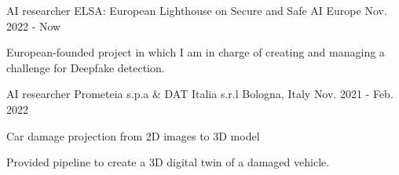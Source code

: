 \begin{cventries}
  \cventry
    {AI researcher} %
    {ELSA: European Lighthouse on Secure and Safe AI} %
    {Europe} %
    {Nov. 2022 - Now} %
    {
      \begin{cvitems}
          \item {European-founded project in which I am in charge of creating and managing a challenge for Deepfake detection. }
      \end{cvitems}
    }
  \cventry
    {AI researcher} %
    {Prometeia s.p.a \& DAT Italia s.r.l} %
    {Bologna, Italy} %
    {Nov. 2021 - Feb. 2022} %
    {
      \begin{cvitems} %
        \item {Car damage projection from 2D images to 3D model}
        \item {Provided pipeline to create a 3D digital twin of a damaged vehicle.}
      \end{cvitems}
    }



\end{cventries}
